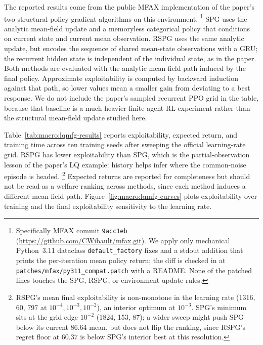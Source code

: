 The reported results come from the public MFAX implementation of the
paper's two structural policy-gradient algorithms on this environment.%
\footnote{Specifically MFAX commit \texttt{9acc1eb}
(\url{https://github.com/CWibault/mfax.git}). We apply only mechanical
Python~3.11 dataclass \texttt{default\_factory} fixes and a stdout
addition that prints the per-iteration mean policy return; the diff is
checked in at \texttt{patches/mfax/py311\_compat.patch} with a README.
None of the patched lines touches the SPG, RSPG, or environment update
rules.}
SPG uses the analytic mean-field update and a memoryless categorical
policy that conditions on current state and current mean observation.
RSPG uses the same analytic update, but encodes the sequence of shared
mean-state observations with a GRU; the recurrent hidden state is
independent of the individual state, as in the paper. Both methods are
evaluated with the analytic mean-field path induced by the final
policy. Approximate exploitability is computed by backward induction
against that path, so lower values mean a smaller gain from deviating
to a best response. We do not include the paper's sampled recurrent PPO
grid in the table, because that baseline is a much heavier finite-agent
RL experiment rather than the structural mean-field update studied here.

Table~\ref{tab:macro:lqmfg-results} reports exploitability, expected
return, and training time across ten training seeds after sweeping the
official learning-rate grid. RSPG has lower exploitability than SPG,
which is the partial-observation lesson of the paper's LQ example:
history helps infer where the common-noise episode is headed.%
\footnote{RSPG's mean final exploitability is non-monotone in the
learning rate (1316, 60, 797 at $10^{-4}, 10^{-3}, 10^{-2}$), an
interior optimum at $10^{-3}$. SPG's minimum sits at the grid edge
$10^{-2}$ (1824, 153, 87); a wider sweep might push SPG below its
current 86.64 mean, but does not flip the ranking, since RSPG's regret
floor at 60.37 is below SPG's interior best at this resolution.}
Expected returns are reported for completeness but should not be read
as a welfare ranking across methods, since each method induces a
different mean-field path. Figure~\ref{fig:macro:lqmfg-curves} plots
exploitability over training and the final exploitability sensitivity
to the learning rate.

\begin{table}[ht]
\centering

\caption{Partially observable Linear-Quadratic mean field game. Approximate
exploitability is computed by a best-response dynamic program on the
analytic mean-field path induced by the final policy. Expected return and
training time are averaged over 10 training seeds, with standard errors
across seeds. Learning rates are selected from the official MFAX grid
$\{10^{-4},10^{-3},10^{-2}\}$ by mean final exploitability for each
method.}
\label{tab:macro:lqmfg-results}
\end{table}

